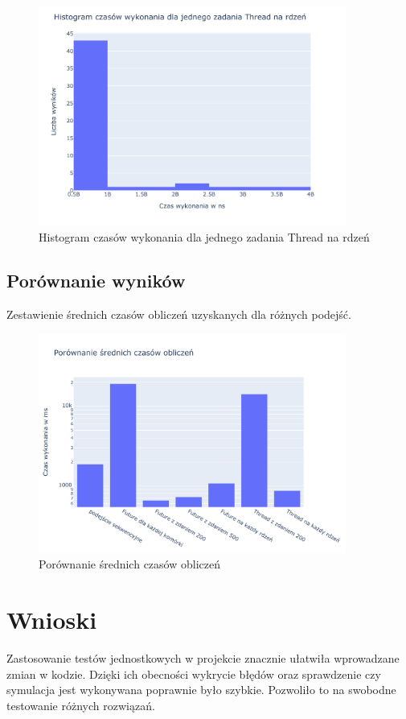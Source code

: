 \documentclass{mwart}
\begin{document}
\begin{figure}[H]
  \centering
  \includegraphics[width=0.9\textwidth]{Parallel_Thread_One_For_Each_Thread_of_life_performance}
  \caption{Histogram czasów wykonania dla jednego zadania Thread na rdzeń}
\end{figure}

\subsection{Porównanie wyników}
Zestawienie średnich czasów obliczeń uzyskanych dla różnych podejść.

\begin{figure}[H]
  \centering
  \includegraphics[width=0.9\textwidth]{Result_comparasion}
  \caption{Porównanie średnich czasów obliczeń}
\end{figure}


\section{Wnioski}



Zastosowanie testów jednostkowych w projekcie znacznie ułatwiła wprowadzane zmian w kodzie. Dzięki ich obecności wykrycie błędów oraz sprawdzenie czy symulacja jest wykonywana poprawnie było szybkie. Pozwoliło to na swobodne testowanie różnych rozwiązań.
\end{document}
